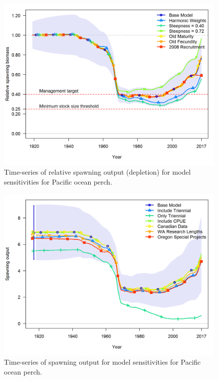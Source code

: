 \documentclass[12pt,]{article}
\begin{document}
\FloatBarrier

\begin{figure}
\centering
\includegraphics{Figures/depl_sens1.png}
\caption{Time-series of relative spawning output (depletion) for model
sensitivities for Pacific ocean perch. \label{fig:sens1_depl}}
\end{figure}

\FloatBarrier

\begin{figure}
\centering
\includegraphics{Figures/ssb_sens2.png}
\caption{Time-series of spawning output for model sensitivities for
Pacific ocean perch. \label{fig:sens2_ssb}}
\end{figure}
\end{document}
